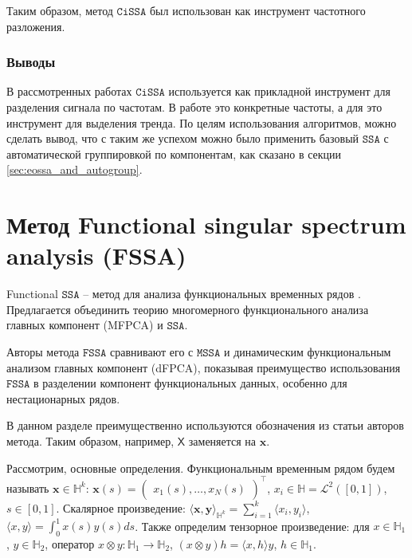 \documentclass[12pt, specialist, subf
]{disser}
\theoremstyle{definition}
\newcommand{\SSA}{\texttt{SSA}}
\newcommand{\CISSA}{\texttt{CiSSA}}
\newcommand{\MSSA}{\texttt{MSSA}}
\newcommand{\FSSA}{\texttt{FSSA}}
\newcommand{\TS}{\mathsf{X}}
\begin{document}
Таким образом, метод $\CISSA$ был использован как инструмент частотного разложения.

\subsection{Выводы}

В рассмотренных работах $\CISSA$ используется как прикладной инструмент для разделения сигнала по частотам. В работе \cite{cognitive} это конкретные частоты, а для \cite{Dey_Thamban_Laluraj_Mahalinganathan_Redkar_Kumar_Matsuoka_2023} это инструмент для выделения тренда. По целям использования алгоритмов, можно сделать вывод, что с таким же успехом можно было применить базовый $\SSA$ с автоматической группировкой по компонентам, как сказано в секции \ref{sec:eossa_and_autogroup}.


\newpage








\chapter{Метод Functional singular spectrum analysis (FSSA)}
\label{sec:fssa}

Functional $\SSA$ -- метод для анализа функциональных временных рядов \cite{haghbin2019functionalsingularspectrumanalysis}. Предлагается объединить теорию многомерного функционального анализа главных компонент (MFPCA) и $\SSA$.

Авторы метода $\FSSA$ сравнивают его с $\MSSA$ и динамическим функциональным анализом главных компонент (dFPCA), показывая преимущество использования $\FSSA$ в разделении компонент функциональных данных, особенно для нестационарных рядов.

В данном разделе преимущественно используются обозначения из статьи \cite{haghbin2019functionalsingularspectrumanalysis} авторов метода. Таким образом, например, $\TS$ заменяется на $\pmb x$.





Рассмотрим, основные определения.
Функциональным временным рядом будем называть ${\pmb x}\in\mathbb{H}^k$: ${\pmb x}(s)=\begin{pmatrix} x_1(s),\ldots,x_N(s)\end{pmatrix}^\top$, $x_i\in\mathbb{H} =\mathcal{L}^2([0,1])$, $s\in[0,1]$. Скалярное произведение: $\langle\pmb x,\pmb y\rangle_{\mathbb{H}^k}=\sum_{i=1}^k\langle x_i,y_i\rangle$, $\langle x,y\rangle=\int_0^1 x(s)y(s)ds$. Также определим тензорное произведение: для $x\in\mathbb{H}_1$, $y\in\mathbb{H}_2$, оператор $x\otimes y:\mathbb{H}_1\to\mathbb{H}_2$, $(x\otimes y)h=\langle x,h\rangle y$, $h\in\mathbb{H}_1$.
\end{document}
